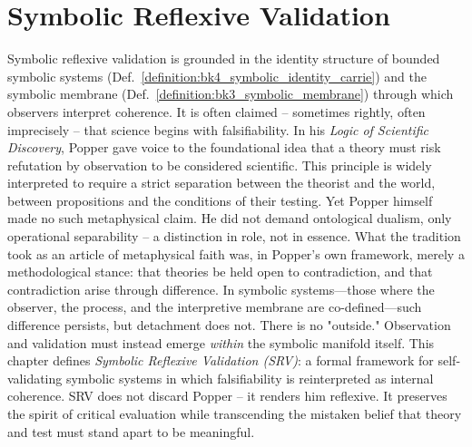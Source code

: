 \section{Symbolic Reflexive Validation}
\label{sec:bk7_symbolic_reflexive_validation}

Symbolic reflexive validation is grounded in the identity structure of bounded symbolic systems (Def.~\ref{definition:bk4_symbolic_identity_carrie}) and the symbolic membrane (Def.~\ref{definition:bk3_symbolic_membrane}) through which observers interpret coherence.
It is often claimed -- sometimes rightly, often imprecisely -- that science begins with falsifiability. In his \emph{Logic of Scientific Discovery}, Popper \cite{popper1935logic} gave voice to the foundational idea that a theory must risk refutation by observation to be considered scientific. This principle is widely interpreted to require a strict separation between the theorist and the world, between propositions and the conditions of their testing.
Yet Popper himself made no such metaphysical claim. He did not demand ontological dualism, only operational separability -- a distinction in role, not in essence. What the tradition took as an article of metaphysical faith was, in Popper's own framework, merely a methodological stance: that theories be held open to contradiction, and that contradiction arise through difference.
In symbolic systems---those where the observer, the process, and the interpretive membrane are co-defined---such difference persists, but detachment does not. There is no "outside." Observation and validation must instead emerge \emph{within} the symbolic manifold itself.
This chapter defines \emph{Symbolic Reflexive Validation (SRV)}: a formal framework for self-validating symbolic systems in which falsifiability is reinterpreted as internal coherence. SRV does not discard Popper -- it renders him reflexive. It preserves the spirit of critical evaluation while transcending the mistaken belief that theory and test must stand apart to be meaningful.
